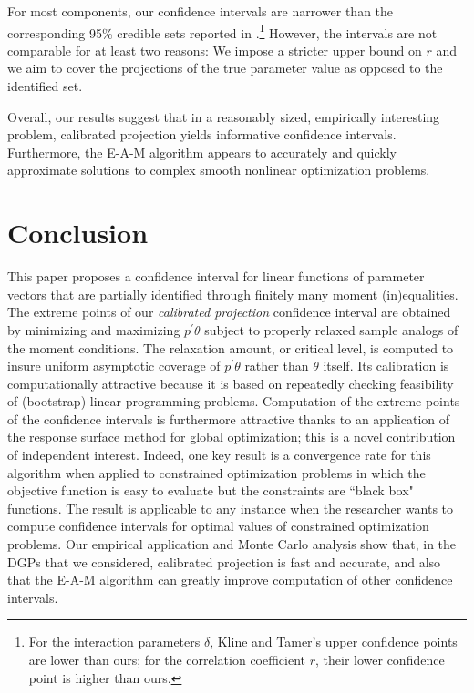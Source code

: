 \documentclass[letterpaper,11pt]{article}
\theoremstyle{myplain}
\theoremstyle{mydefinition}
\theoremstyle{myremark}
\renewcommand{\cite}{\citet}
\numberwithin{equation}{section}
\numberwithin{figure}{section}
\begin{document}
For most components, our confidence intervals are narrower than the corresponding 95\% credible sets reported in \cite{KT15}.\footnote{For the interaction parameters $\delta$, Kline and Tamer's upper confidence points are lower than ours; for the correlation coefficient $r$, their lower confidence point is higher than ours.}
However, the intervals are not comparable for at least two reasons: We impose a stricter upper bound on $r$ and we aim to cover the projections of the true parameter value as opposed to the identified set.

Overall, our results suggest that in a reasonably sized, empirically interesting problem, calibrated projection yields informative confidence intervals. Furthermore, the E-A-M algorithm appears to accurately and quickly approximate solutions to complex smooth nonlinear optimization problems.

\section{Conclusion}
\label{sec:conclusion}
This paper proposes a confidence interval for linear functions of parameter vectors that are partially identified through finitely many moment (in)equalities.
The extreme points of our \emph{calibrated projection} confidence interval are obtained by minimizing and maximizing $p^\prime \theta$ subject to properly relaxed sample analogs of the moment conditions.
The relaxation amount, or critical level, is computed to insure uniform asymptotic coverage of $p^\prime \theta$ rather than $\theta$ itself. Its calibration is computationally attractive because it is based on repeatedly checking feasibility of (bootstrap) linear programming problems.
Computation of the extreme points of the confidence intervals is furthermore attractive thanks to an application of the response surface method for global optimization; this is a novel contribution of independent interest.
Indeed, one key result is a convergence rate for this algorithm when applied to constrained optimization problems in which the objective function is easy to evaluate but the constraints are ``black box" functions.
The result is applicable to any instance when the researcher wants to compute confidence intervals for optimal values of constrained optimization problems.
Our empirical application and Monte Carlo analysis show that, in the DGPs that we considered, calibrated projection is fast and accurate, and also that the E-A-M algorithm can greatly improve computation of other confidence intervals.
\end{document}
